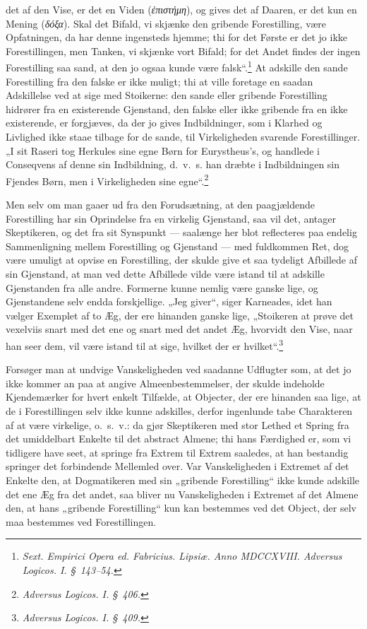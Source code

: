\documentclass[12pt]{book}
\newcommand{\opage}[1]{\marginnote{\footnotesize\textit{[#1]}}}
\begin{document}
det af den Vise, er det en Viden (\textit{ἐπιστήμη}), og gives det
af Daaren, er det kun en Mening (\textit{δόξα}). Skal det Bifald, vi
skjænke den gribende Forestilling, være Opfatningen, da har
denne ingensteds hjemme; thi for det Første er det jo ikke
Forestillingen, men Tanken, vi skjænke vort Bifald; for det
Andet findes der ingen Forestilling saa sand, at den jo ogsaa
kunde være falsk“.\footnote{\textit{Sext. Empirici Opera ed. Fabricius. Lipsiæ. Anno MDCCXVIII.
Adversus Logicos. I. §~143--54.}}%
{} At adskille den sande Forestilling fra
den falske er ikke muligt; thi at ville foretage en saadan Adskillelse
ved at sige med Stoikerne: den sande eller gribende
Forestilling hidrører fra en existerende Gjenstand, den falske
eller ikke gribende fra en ikke existerende, er forgjæves, da der
jo gives Indbildninger, som i Klarhed og Livlighed ikke staae
tilbage for de sande, til Virkeligheden svarende Forestillinger.
„I sit Raseri tog Herkules sine egne Børn for Eurystheus's,
og handlede i Conseqvens af denne sin Indbildning, d.\ v.\ s.
han dræbte i Indbildningen sin Fjendes Børn, men i Virkeligheden
sine egne“.\footnote{\textit{Adversus Logicos. I. §~406.}}%

Men selv om man gaaer ud fra den Forudsætning, at
den paagjældende Forestilling har sin Oprindelse fra en virkelig
Gjenstand, saa vil det, antager Skeptikeren, og det fra sit Synspunkt
--- saalænge her blot reflecteres paa endelig Sammenligning
mellem Forestilling og Gjenstand --- med fuldkommen
Ret, dog være umuligt at opvise en Forestilling, der skulde
give et saa tydeligt Afbillede af sin Gjenstand, at man ved
dette Afbillede vilde være istand til at adskille Gjenstanden fra
alle andre. Formerne kunne nemlig være ganske lige, og
Gjenstandene selv endda forskjellige. „Jeg giver“, siger Karneades,
idet han vælger Exemplet af to Æg, der ere hinanden
ganske lige, „Stoikeren at prøve det vexelviis snart med det
\opage{284}ene og snart med det andet Æg, hvorvidt den Vise, naar han
seer dem, vil være istand til at sige, hvilket der er hvilket“.\footnote{\textit{Adversus Logicos. I. §~409.}}%

Forsøger man at undvige Vanskeligheden ved saadanne
Udflugter som, at det jo ikke kommer an paa at angive Almeenbestemmelser,
der skulde indeholde Kjendemærker for hvert
enkelt Tilfælde, at Objecter, der ere hinanden saa lige, at de
i Forestillingen selv ikke kunne adskilles, derfor ingenlunde
tabe Charakteren af at være virkelige, o.\ s.\ v.: da gjør Skeptikeren
med stor Lethed et Spring fra det umiddelbart Enkelte
til det abstract Almene; thi hans Færdighed er, som vi
tidligere have seet, at springe fra Extrem til Extrem saaledes,
at han bestandig springer det forbindende Mellemled over.
Var Vanskeligheden i Extremet af det Enkelte den, at Dogmatikeren
med sin „gribende Forestilling“ ikke kunde adskille det
ene Æg fra det andet, saa bliver nu Vanskeligheden i Extremet
af det Almene den, at hans „gribende Forestilling“ kun kan
bestemmes ved det Object, der selv maa bestemmes ved Forestillingen.
\end{document}
